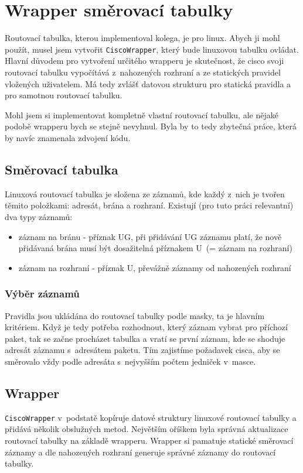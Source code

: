 \section{Wrapper směrovací tabulky}
Routovací tabulka, kterou implementoval kolega, je  pro linux. Abych ji mohl použít, musel jsem vytvořit \verb|CiscoWrapper|, který bude linuxovou tabulku ovládat. Hlavní důvodem pro vytvoření určitého wrapperu je skutečnost, že cisco svoji routovací tabulku vypočítává z~nahozených rozhraní a ze statických pravidel vložených uživatelem. Má tedy zvlášť datovou strukturu pro statická pravidla a pro samotnou routovací tabulku.

Mohl jsem si implementovat kompletně vlastní routovací tabulku, ale nějaké podobě wrapperu bych se stejně nevyhnul. Byla by to tedy zbytečná práce, která by navíc znamenala zdvojení kódu.


\subsection{Směrovací tabulka}
Linuxová routovací tabulka je složena ze záznamů, kde každý z~nich je tvořen těmito položkami: adresát, brána a rozhraní. Existují (pro tuto práci relevantní) dva typy záznamů:
\begin{itemize}
 \item záznam na bránu - příznak UG, při přidávání UG záznamu platí, že nově přidávaná brána musí být dosažitelná příznakem U~(= záznam na rozhraní)
 \item záznam na rozhraní - příznak U, převážně záznamy od nahozených rozhraní
\end{itemize}


\subsubsection{Výběr záznamů}
Pravidla jsou ukládána do routovací tabulky podle masky, ta je hlavním kritériem. Když je tedy potřeba rozhodnout, který záznam vybrat pro příchozí paket, tak se začne procházet tabulka a vratí se první záznam, kde se shoduje adresát záznamu s~adresátem paketu. Tím zajistíme požadavek cisca, aby se směrovalo vždy podle adresáta s~nejvyšším počtem jedniček v~masce.

\subsection{Wrapper}
\verb|CiscoWrapper| v~podstatě kopíruje datové struktury linuxové routovací tabulky a přidává několik obslužných metod. Největším oříškem byla správná aktualizace routovací tabulky na základě wrapperu. Wrapper si pamatuje statické směrovací záznamy a dle nahozených rozhraní generuje správné záznamy do routovací tabulky. 

